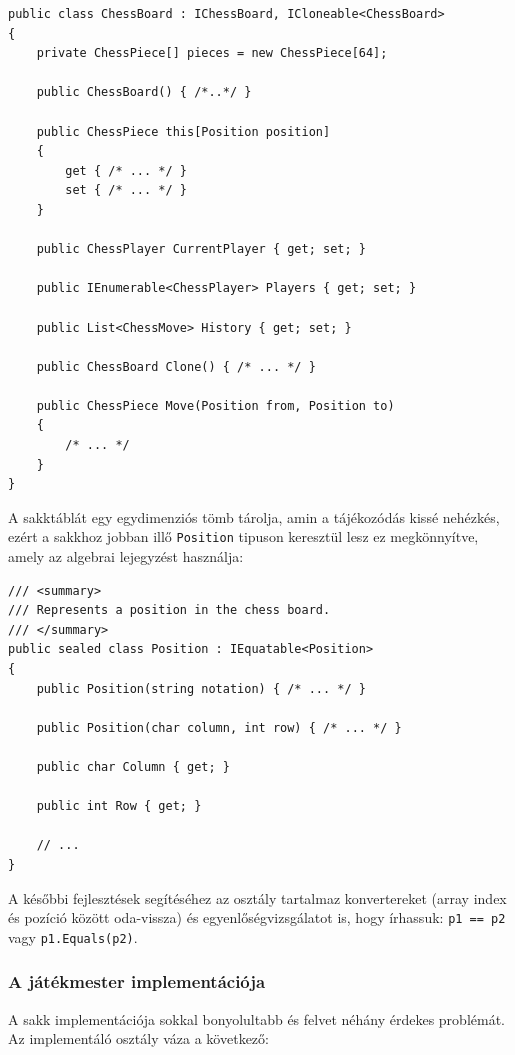 \documentclass[twoside, a4paper, 12pt]{article}
\begin{document}
\begin{lstlisting}[caption=Sakktábla implementáció vázlat, label=lst:chessboard_code]
public class ChessBoard : IChessBoard, ICloneable<ChessBoard>
{
	private ChessPiece[] pieces = new ChessPiece[64];

	public ChessBoard()	{ /*..*/ }

	public ChessPiece this[Position position]
	{
		get { /* ... */ }
		set { /* ... */ }
	}

	public ChessPlayer CurrentPlayer { get; set; }

	public IEnumerable<ChessPlayer> Players { get; set; }

	public List<ChessMove> History { get; set; }

	public ChessBoard Clone() { /* ... */ }

	public ChessPiece Move(Position from, Position to)
	{
		/* ... */
	}
}
\end{lstlisting}

A sakktáblát egy egydimenziós tömb tárolja, amin a tájékozódás kissé nehézkés, ezért a sakkhoz jobban illő \texttt{Position} tipuson keresztül lesz ez megkönnyítve, amely az algebrai lejegyzést használja:

\begin{lstlisting}[caption=Pozíciók a sakktáblán - Position osztály, label=lst:chessboardposition_code]
/// <summary>
/// Represents a position in the chess board.
/// </summary>
public sealed class Position : IEquatable<Position>
{
	public Position(string notation) { /* ... */ }
	
	public Position(char column, int row) { /* ... */ }
	
	public char Column { get; }
	
	public int Row { get; }
	
	// ...
}
\end{lstlisting}

A későbbi fejlesztések segítéséhez az osztály tartalmaz konvertereket (array index és pozíció között oda-vissza) és egyenlőségvizsgálatot is, hogy írhassuk: \texttt{p1 == p2} vagy \texttt{p1.Equals(p2)}.

\subsubsection{A játékmester implementációja}

A sakk implementációja sokkal bonyolultabb és felvet néhány érdekes problémát. Az implementáló osztály váza a következő:
\end{document}
